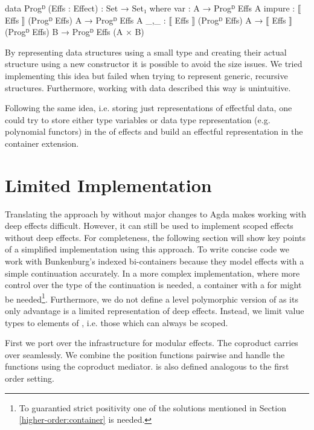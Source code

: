 \begin{code}
data Progᴰ (Effs : Effect) : Set → Set₁ where
  var     : A → Progᴰ Effs A
  impure  : ⟦ Effs ⟧ (Progᴰ Effs) A → Progᴰ Effs A
  _,_     : ⟦ Effs ⟧ (Progᴰ Effs) A → ⟦ Effs ⟧ (Progᴰ Effs) B → Progᴰ Effs (A × B)
\end{code}
By representing data structures using a small type and creating their actual
structure using a new  constructor it is possible to avoid
the size issues.
We tried implementing this idea but failed when trying to represent generic,
recursive structures.
Furthermore, working with data described this way is unintuitive.

Following the same idea, i.e. storing just representations of effectful data,
one could try to store either type variables or data type representation (e.g.
polynomial functors) in the  of effects and build an effectful
representation in the container extension.

\section{Limited Implementation}
\label{higher-order:limited-impl}

Translating the approach by \textcite{DBLP:conf/haskell/WuSH14} without major
changes to Agda makes working with deep effects difficult.
However, it can still be used to implement scoped effects without deep effects.
For completeness, the following section will show key points of a simplified
implementation using this approach.
To write concise code we work with Bunkenburg's indexed bi-containers
because they model effects with a simple continuation accurately.
In a more complex implementation, where more control over the type of the
continuation is needed, a container with a  for 
might be needed\footnote{To guarantied strict positivity one of the solutions
mentioned in Section \ref{higher-order:container} is needed.}.
Furthermore, we do not define a level polymorphic version of 
as its only advantage is a limited representation of deep effects.
Instead, we limit value types to elements of , i.e. those which
can always be scoped.

First we port over the infrastructure for modular effects.
The coproduct carries over seamlessly.
We combine the position functions pairwise and handle the 
functions using the coproduct mediator.
 is also defined analogous to the first order
setting.

